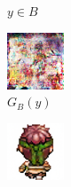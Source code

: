 \documentclass[twocolumn,11pt]{ctexart}
\begin{document}
\begin{figure}[htb]
\begin{subfigure}[b]{0.23\linewidth}
        \caption{$y \in B$}
      \end{subfigure}
      \begin{subfigure}[b]{0.23\linewidth}
        \includegraphics[width=\linewidth]{exp5_epoch140_fake_A.png}
        \caption{$G_B(y)$}
      \end{subfigure}
      \begin{subfigure}[b]{0.23\linewidth}
        \includegraphics[width=\linewidth]{exp5_epoch140_rec_B.png}

\end{subfigure}
\end{figure}
\end{document}
